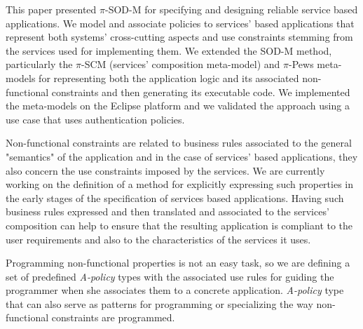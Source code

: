 This paper presented $\pi$-SOD-M for specifying and designing reliable service based applications. We model and associate policies to  services' based applications that represent both systems' cross-cutting aspects and use constraints stemming from the services used for implementing them.  We extended the SOD-M method, particularly the $\pi$-SCM (services' composition meta-model) and $\pi$-{\sc Pews} meta-models for representing both the application logic and its associated non-functional constraints and then generating its executable code. We implemented the meta-models on the Eclipse platform and we validated the approach using a use case that uses authentication  policies.

Non-functional constraints are related to business rules associated to the general "semantics" of the application and in the case of services' based applications, they also concern the use constraints imposed by the services. We are currently working on the definition of a method for explicitly expressing such properties in the early stages of the specification of services based applications. Having such business rules expressed and then translated and associated to the services' composition can help to ensure that the resulting application is compliant to the user requirements and also to the characteristics of the services it uses.

Programming non-functional properties is not an easy task, so we are defining a set of predefined {\em A-policy} types with the associated use rules for guiding the programmer when she associates them to a concrete application. {\em A-policy} type  that can also serve as patterns for programming or specializing the way non-functional constraints are programmed.

